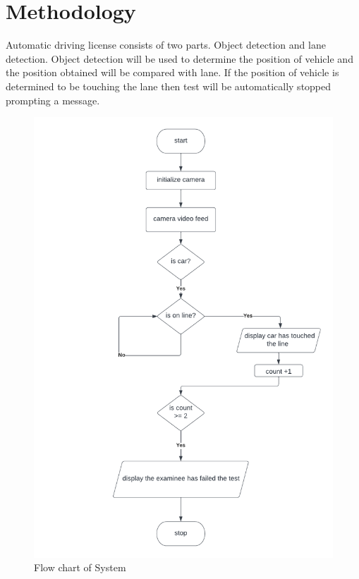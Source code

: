 \chapter{Methodology}
Automatic driving license consists of two parts. Object detection and lane detection. Object detection will be used to determine the position of vehicle and the position obtained will be compared with lane. If the position of vehicle is determined to be touching the lane then test will be automatically stopped prompting a message.  

\begin{figure}[tbh] %
\begin{center}
	\includegraphics{images/final block diagram.png}
	\caption{Flow chart of System} %
	\label{figObjectDetectionusingYOLO} %
\end{center}
\end{figure}

